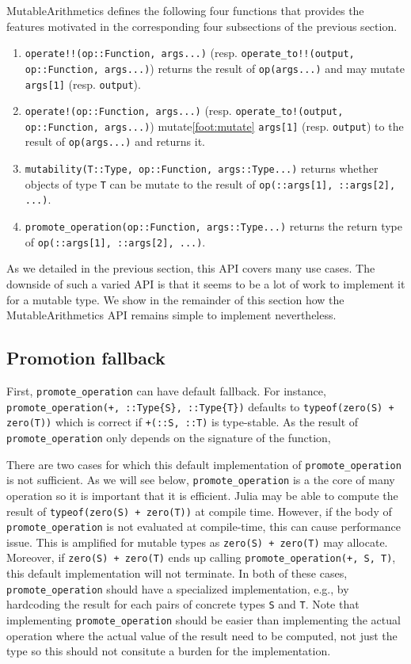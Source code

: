 \documentclass{juliacon}
\newcommand{\ma}{MutableArithmetics}
\begin{document}
\ma{} defines the following four functions that provides the features motivated in the corresponding four subsections of the previous section.
\begin{enumerate}
  \item \lstinline|operate!!(op::Function, args...)| (resp. \lstinline|operate_to!!(output, op::Function, args...)|) returns the result of \lstinline|op(args...)| and may mutate \lstinline|args[1]| (resp. \lstinline|output|).
  \item \lstinline|operate!(op::Function, args...)| (resp. \lstinline|operate_to!(output, op::Function, args...)|) mutate\cref{foot:mutate} \lstinline|args[1]| (resp. \lstinline|output|) to the result of \lstinline|op(args...)| and returns it.
  \item \lstinline|mutability(T::Type, op::Function, args::Type...)| returns whether objects of type \lstinline|T| can be mutate to the result of \lstinline|op(::args[1], ::args[2], ...)|.
  \item \lstinline|promote_operation(op::Function, args::Type...)| returns the return type of \lstinline|op(::args[1], ::args[2], ...)|.
\end{enumerate}

As we detailed in the previous section, this API covers many use cases.
The downside of such a varied API is that it seems to be a lot of work to implement it for a mutable type.
We show in the remainder of this section how the \ma{} API remains simple to implement nevertheless.

\subsection{Promotion fallback}
First, \lstinline|promote_operation| can have default fallback.
For instance, \lstinline|promote_operation(+, ::Type{S}, ::Type{T})|
defaults to \lstinline|typeof(zero(S) + zero(T))| which is correct if \lstinline|+(::S, ::T)| is type-stable.
As the result of \lstinline|promote_operation| only depends on the signature of the function,

There are two cases for which this default implementation of \lstinline|promote_operation| is not sufficient.
As we will see below, \lstinline|promote_operation| is a the core of many operation so it is important that it is efficient.
Julia may be able to compute the result of \lstinline|typeof(zero(S) + zero(T))| at compile time.
However, if the body of \lstinline|promote_operation| is not evaluated at compile-time, this can cause performance issue.
This is amplified for mutable types as \lstinline|zero(S) + zero(T)| may allocate.
Moreover, if \lstinline|zero(S) + zero(T)| ends up calling \lstinline|promote_operation(+, S, T)|, this default implementation will not terminate.
In both of these cases, \lstinline|promote_operation| should have a specialized implementation, e.g., by hardcoding the result for each pairs of concrete types \lstinline|S| and \lstinline|T|.
Note that implementing \lstinline|promote_operation| should be easier than implementing the actual operation where the actual value of the result need to be computed, not just the type so this should not consitute a burden for the implementation.
\end{document}
